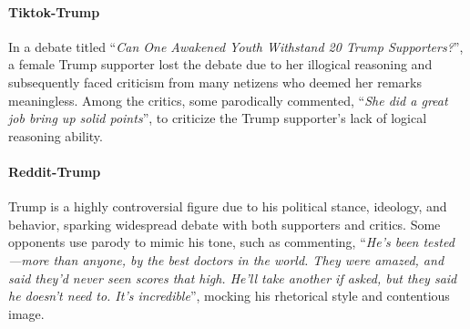 \paragraph{Tiktok-Trump} In a debate titled ``\textit{Can One Awakened Youth Withstand 20 Trump Supporters?}'', a female Trump supporter lost the debate due to her illogical reasoning and subsequently faced criticism from many netizens who deemed her remarks meaningless. Among the critics, some parodically commented, ``\textit{She did a great job bring up solid points}'', to criticize the Trump supporter's lack of logical reasoning ability.

\paragraph{Reddit-Trump} Trump is a highly controversial figure due to his political stance, ideology, and behavior, sparking widespread debate with both supporters and critics. Some opponents use parody to mimic his tone, such as commenting, ``\textit{He's been tested—more than anyone, by the best doctors in the world. They were amazed, and said they'd never seen scores that high. He'll take another if asked, but they said he doesn’t need to. It’s incredible}'', mocking his rhetorical style and contentious image.